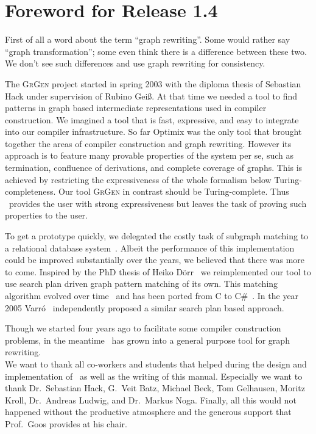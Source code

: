 \chapter*{Foreword for Release 1.4}
First of all a word about the term ``graph rewriting''.
Some would rather say ``graph transformation''; some even think there is a difference between these two.
We don't see such differences and use graph rewriting for consistency.

The \textsc{GrGen} project started in spring 2003 with the diploma thesis of Sebastian Hack under supervision of Rubino Gei\ss.
At that time we needed a tool to find patterns in graph based intermediate representations used in compiler construction.
We imagined a tool that is fast, expressive, and easy to integrate into our compiler infrastructure.
So far Optimix\cite{assmann00graph} was the only tool that brought together the areas of compiler construction and graph rewriting.
However its approach is to feature many provable properties of the system per se, such as termination, confluence of derivations, and complete coverage of graphs.
This is achieved by restricting the expressiveness of the whole formalism below Turing-completeness.
Our tool \textsc{GrGen} in contrast should be Turing-complete.
Thus \GrG\ provides the user with strong expressiveness but leaves the task of proving such properties to the user.

To get a prototype quickly, we delegated the costly task of subgraph matching to a relational database system~\cite{Hac:03}.
Albeit the performance of this implementation could be improved substantially over the years, we believed that there was more to come.
Inspired by the PhD thesis of Heiko D\"orr~\cite{doerr} we reimplemented our tool to use search plan driven graph pattern matching of its own.
This matching algorithm evolved over time~\cite{adam,Bat:05:SA,Bat:05:DA,Bat:06,BKG:07} and has been ported from C to C\#~\cite{KG:07,Kro:07}.
In the year 2005 Varr\'o~\cite{gramot2005_adapt} independently proposed a similar search plan based approach.

Though we started four years ago to facilitate some compiler construction problems, in the meantime \GrG\ has grown into a general purpose tool for graph rewriting.\\[3ex]

We want to thank all co-workers and students that helped during the design and implementation of \GrG\ as well as the writing of this manual.
Especially we want to thank Dr.~Sebastian Hack, G.~Veit Batz, Michael Beck, Tom Gelhausen, Moritz Kroll, Dr.~Andreas Ludwig, and Dr.~Markus Noga.
Finally, all this would not happened without the productive atmosphere and the generous support that Prof.~Goos provides at his chair.\\[3ex]

